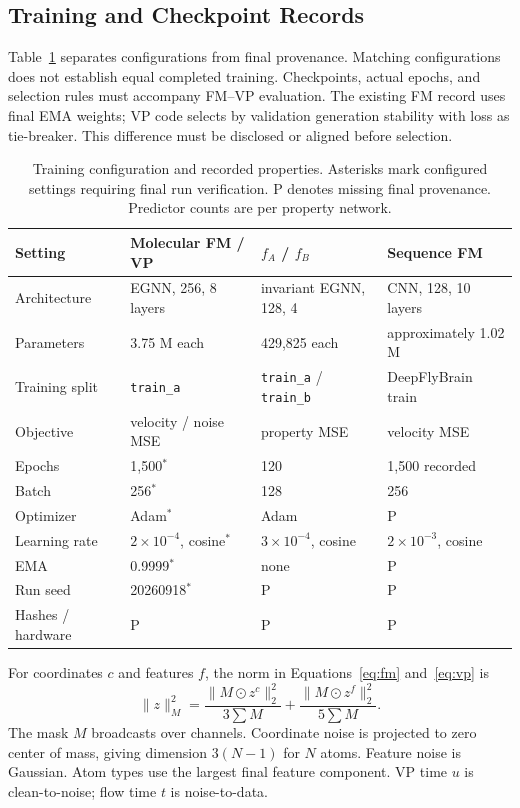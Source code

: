 \documentclass{article}
\newcommand{\pend}{\textcolor{black!60}{\textsf{P}}}
\begin{document}
\subsection{Training and Checkpoint Records}\label{app:training}
Table~\ref{tab:training} separates configurations from final provenance. Matching configurations does not establish equal completed training. Checkpoints, actual epochs, and selection rules must accompany FM--VP evaluation. The existing FM record uses final EMA weights; VP code selects by validation generation stability with loss as tie-breaker. This difference must be disclosed or aligned before selection.

\begin{table}[!htbp]
\centering\small
\caption{Training configuration and recorded properties. Asterisks mark configured settings requiring final run verification. P denotes missing final provenance. Predictor counts are per property network.}
\label{tab:training}
\begin{tabular}{llll}
\toprule
Setting & Molecular FM / VP & $f_A$ / $f_B$ & Sequence FM\\
\midrule
Architecture & EGNN, 256, 8 layers & invariant EGNN, 128, 4 & CNN, 128, 10 layers\\
Parameters & 3.75 M each & 429{,}825 each & approximately 1.02 M\\
Training split & \texttt{train\_a} & \texttt{train\_a} / \texttt{train\_b} & DeepFlyBrain train\\
Objective & velocity / noise MSE & property MSE & velocity MSE\\
Epochs & 1{,}500$^*$ & 120 & 1{,}500 recorded\\
Batch & 256$^*$ & 128 & 256\\
Optimizer & Adam$^*$ & Adam & \pend\\
Learning rate & $2\times10^{-4}$, cosine$^*$ & $3\times10^{-4}$, cosine & $2\times10^{-3}$, cosine\\
EMA & 0.9999$^*$ & none & \pend\\
Run seed & 20260918$^*$ & \pend & \pend\\
Hashes / hardware & \pend & \pend & \pend\\
\bottomrule
\end{tabular}
\end{table}

For coordinates $c$ and features $f$, the norm in Equations~\eqref{eq:fm} and~\eqref{eq:vp} is
\[
\|z\|_M^2=\frac{\|M\odot z^c\|_2^2}{3\sum M}+\frac{\|M\odot z^f\|_2^2}{5\sum M}.
\]
The mask $M$ broadcasts over channels. Coordinate noise is projected to zero center of mass, giving dimension $3(N-1)$ for $N$ atoms. Feature noise is Gaussian. Atom types use the largest final feature component. VP time $u$ is clean-to-noise; flow time $t$ is noise-to-data.
\end{document}
